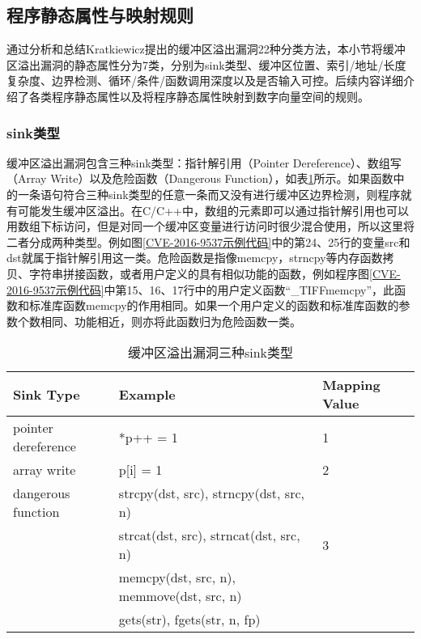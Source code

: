 {\subsection{程序静态属性与映射规则}

通过分析和总结Kratkiewicz提出的缓冲区溢出漏洞22种分类方法，本小节将缓冲区溢出漏洞的静态属性分为7类，分别为sink类型、缓冲区位置、索引/地址/长度复杂度、边界检测、循环/条件/函数调用深度以及是否输入可控。后续内容详细介绍了各类程序静态属性以及将程序静态属性映射到数字向量空间的规则。

\subsubsection{sink类型}

缓冲区溢出漏洞包含三种sink类型：指针解引用（Pointer Dereference）、数组写（Array Write）以及危险函数（Dangerous Function），如表\ref{Description_of_Three_Sink_Types}所示。如果函数中的一条语句符合三种sink类型的任意一条而又没有进行缓冲区边界检测，则程序就有可能发生缓冲区溢出。在C/C++中，数组的元素即可以通过指针解引用也可以用数组下标访问，但是对同一个缓冲区变量进行访问时很少混合使用，所以这里将二者分成两种类型。例如图\ref{CVE-2016-9537示例代码}中的第24、25行的变量src和dst就属于指针解引用这一类。危险函数是指像memcpy，strncpy等内存函数拷贝、字符串拼接函数，或者用户定义的具有相似功能的函数，例如程序图\ref{CVE-2016-9537示例代码}中第15、16、17行中的用户定义函数“\_TIFFmemcpy”，此函数和标准库函数memcpy的作用相同。如果一个用户定义的函数和标准库函数的参数个数相同、功能相近，则亦将此函数归为危险函数一类。

\begin{table}[ht]
\begin{center}
\caption{缓冲区溢出漏洞三种sink类型} \label{Description_of_Three_Sink_Types}
\begin{small}
\begin{tabular}{lll}
\hline
{\bf Sink Type} & {\bf Example} & {\bf Mapping Value} \\
\hline
pointer dereference & *p++ = 1 &  1\\
\hline
array write & p[i] = 1 & 2 \\ \hline
dangerous function & strcpy(dst, src), strncpy(dst, src, n)\\
& strcat(dst, src), strncat(dst, src, n) & 3\\
& memcpy(dst, src, n), memmove(dst, src, n) &\\
& gets(str), fgets(str, n, fp)
 &  \\ \hline
\end{tabular}
\end{small}
\end{center}
\end{table}

}
